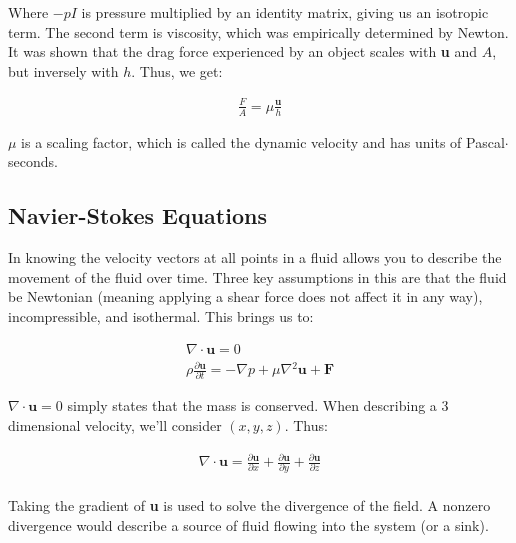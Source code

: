 Where $-pI$ is pressure multiplied by an identity matrix, giving us an isotropic term. The second term is viscosity, which was empirically determined by Newton. It was shown that the drag force experienced by an object scales with \textbf{u} and $A$, but inversely with $h$. Thus, we get:

\begin{equation} \label{phenom1}
\begin{split}
\frac{F}{A} = \mu \frac{\mathbf{u}}{h} 
\end{split}
\end{equation}

$\mu$ is a scaling factor, which is called the dynamic velocity and has units of Pascal$\cdot$seconds. 

\subsection{Navier-Stokes Equations}

\label{sec:imstoked}

In knowing the velocity vectors at all points in a fluid allows you to describe the movement of the fluid over time. Three key assumptions in this are that the fluid be Newtonian (meaning applying a shear force does not affect it in any way), incompressible, and isothermal. This brings us to:

\begin{equation} \label{NS1}
\begin{split}
\nabla \cdot \mathbf{u} = 0 \\
\rho \frac{\partial \mathbf{u}}{\partial t}= -\nabla p + \mu \nabla{}^2\mathbf{u} + \mathbf{F} 
\end{split}
\end{equation}

$\nabla \cdot \mathbf{u} = 0$ simply states that the mass is conserved. When describing a 3 dimensional velocity, we'll consider $(x,y,z)$. Thus:

\begin{equation} \label{NS2}
\begin{split}
\nabla \cdot \mathbf{u} =  \frac{\partial \textbf{u}}{\partial x} + \frac{\partial \textbf{u}}{\partial y} + \frac{\partial \textbf{u}}{\partial z}\\
\end{split}
\end{equation}

Taking the gradient of \textbf{u} is used to solve the divergence of the field. A nonzero divergence would describe a source of fluid flowing into the system (or a sink).\newline

